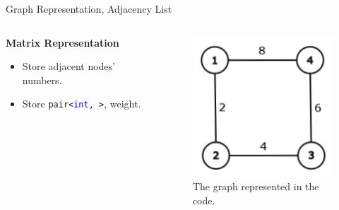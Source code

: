 \documentclass[aspectratio=169]{beamer}%
\begin{document}
\begin{frame}{Graph Representation, Adjacency List}
    \begin{columns}
        \begin{column}{0.72\textwidth}
            \textbf{Matrix Representation}\\
            \begin{itemize}
                \item Store adjacent nodes' numbers.
                \item Store \texttt{pair<\textcolor{blue}{int}, \color{blue}{int}>}, weight.
            \end{itemize}
            
        \end{column}
        \hfill
        \begin{column}{0.24\textwidth}
            \begin{figure}
                \centering
                \includegraphics[width= 0.9\linewidth]{graph9.png}
                \caption{The graph represented in the code.}
            \end{figure}
        \end{column}
    \end{columns}
\end{frame}
\end{document}
